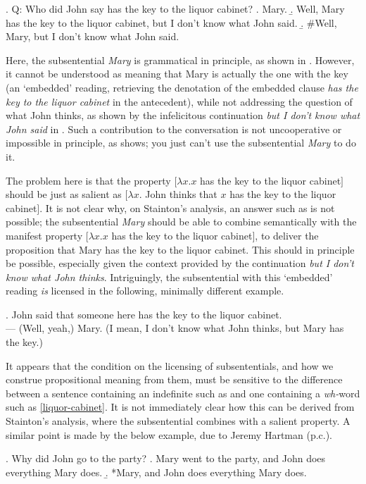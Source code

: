 \documentclass[doublespace]{umthesis}
\begin{document}
\ex. 	Q: Who did John say has the key to the liquor cabinet?\label{liquor-cabinet}
	\a. Mary.
	\b. Well, Mary has the key to the liquor cabinet, but I don't know what John said.
	\b. \#Well, Mary, but I don't know what John said.

Here, the subsentential {\it Mary} is grammatical in principle, as shown in \Last[a]. However, it cannot be understood as meaning that Mary is actually the one with the key (an `embedded' reading, retrieving the denotation of the embedded clause {\it has the key to the liquor cabinet} in the antecedent), while not addressing the question of what John thinks, as shown by the infelicitous continuation {\it but I don't know what John said} in \Last[c]. Such a contribution to the conversation is not uncooperative or impossible in principle, as \Last[b] shows; you just can't use the subsentential {\it Mary} to do it.
	
The problem here is that the property $[\lambda x. x $ has the key to the liquor cabinet$]$ should be just as salient as $[\lambda x. $ John thinks that $ x $ has the key to the liquor cabinet$]$. It is not clear why, on Stainton's analysis, an answer such as \LLast[c] is not possible; the subsentential {\it Mary} should be able to combine semantically with the manifest property $[\lambda x. x $ has the key to the liquor cabinet$]$, to deliver the proposition that Mary has the key to the liquor cabinet. This should in principle be possible, especially given the context provided by the continuation {\it but I don't know what John thinks}. Intriguingly, the subsentential with this `embedded' reading \emph{is} licensed in the following, minimally different example.

\ex. 	John said that someone here has the key to the liquor cabinet.\\
	--- (Well, yeah,) Mary. (I mean, I don't know what John thinks, but Mary has the key.) \label{indefinite-liquor-cabinet}
	
It appears that the condition on the licensing of subsententials, and how we construe propositional meaning from them, must be sensitive to the difference between a sentence containing an indefinite such as \Last and one containing a {\it wh-}word such as \ref{liquor-cabinet}. It is not immediately clear how this can be derived from Stainton's analysis, where the subsentential combines with a salient property. A similar point is made by the below example, due to Jeremy Hartman (p.c.).

\ex. 	Why did John go to the party? \label{why-questions-don't-give-you-antecedents}
	\a. Mary went to the party, and John does everything Mary does.
	\b. *Mary, and John does everything Mary does.
	
\end{document}
